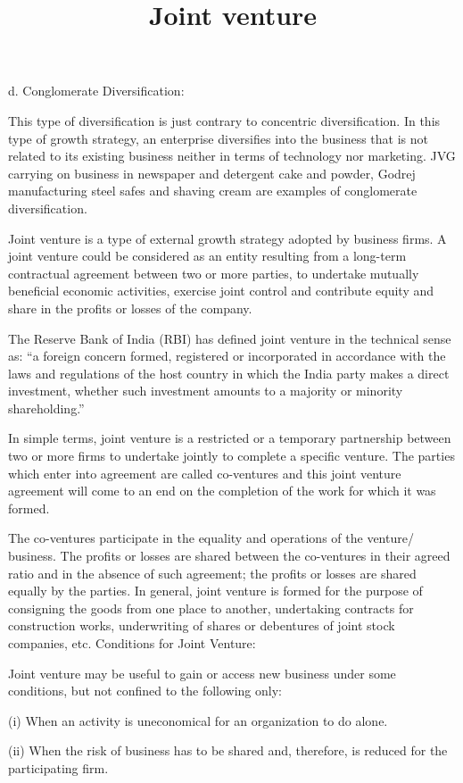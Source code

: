 \documentclass{article}
\begin{document}
d. Conglomerate Diversification:

This type of diversification is just contrary to concentric diversification. In this type of growth strategy, an enterprise
 diversifies into the business that is not related to its existing business neither in terms of technology nor marketing. 
 JVG carrying on business in newspaper and detergent cake and powder, Godrej manufacturing steel safes and shaving cream 
 are examples of conglomerate diversification.

\title{ Joint venture}
Joint venture is a type of external growth strategy adopted by business firms. A joint venture could be considered as an entity 
resulting from a long-term contractual agreement between two or more parties, to undertake mutually beneficial economic activities,
 exercise joint control and contribute equity and share in the profits or losses of the company.

The Reserve Bank of India (RBI) has defined joint venture in the technical sense as: “a foreign concern formed, registered or 
incorporated in accordance with the laws and regulations of the host country in which the India party makes a direct investment, 
whether such investment amounts to a majority or minority shareholding.”

In simple terms, joint venture is a restricted or a temporary partnership between two or more firms to undertake jointly to 
complete a specific venture. The parties which enter into agreement are called co-ventures and this joint venture agreement
 will come to an end on the completion of the work for which it was formed.

The co-ventures participate in the equality and operations of the venture/ business. The profits or losses are shared between 
the co-ventures in their agreed ratio and in the absence of such agreement; the profits or losses are shared equally by the 
parties. In general, joint venture is formed for the purpose of consigning the goods from one place to another, undertaking
contracts for construction works, underwriting of shares or debentures of joint stock companies, etc.
Conditions for Joint Venture:

Joint venture may be useful to gain or access new business under some conditions, but not confined to the following only:

(i) When an activity is uneconomical for an organization to do alone.

(ii) When the risk of business has to be shared and, therefore, is reduced for the participating firm.
\end{document}
